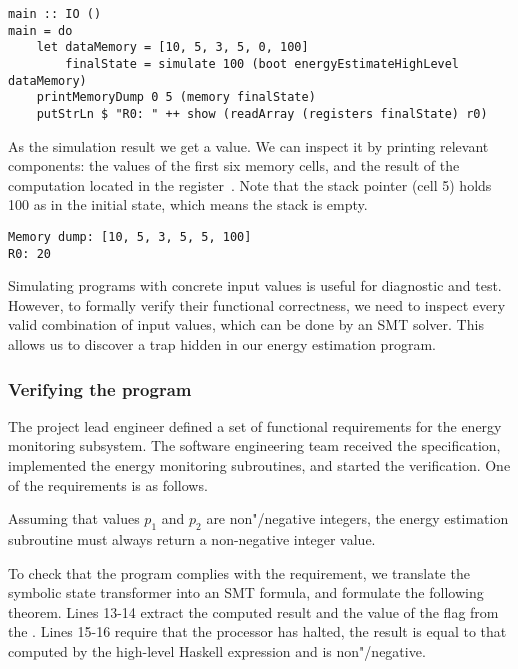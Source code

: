 \begin{verbatim}
main :: IO ()
main = do
    let dataMemory = [10, 5, 3, 5, 0, 100]
        finalState = simulate 100 (boot energyEstimateHighLevel dataMemory)
    printMemoryDump 0 5 (memory finalState)
    putStrLn $ "R0: " ++ show (readArray (registers finalState) r0)
\end{verbatim}


\noindent
As the simulation result we get a  value. We can inspect it by
printing relevant components: the values of the first six memory cells, and the
result of the computation located in the register~. Note that the stack
pointer (cell 5) holds 100 as in the initial state, which means the stack is empty.


\begin{verbatim}
Memory dump: [10, 5, 3, 5, 5, 100]
R0: 20
\end{verbatim}


Simulating programs with concrete input values is useful for diagnostic and test.
However, to formally verify their functional correctness, we need to inspect
every valid combination of input values, which can be done by an SMT solver.
This allows us to discover a trap hidden in our energy estimation program.


\subsubsection{Verifying the program}
The project lead engineer defined a set of functional requirements for the
energy monitoring subsystem. The software engineering team received the
specification, implemented the energy monitoring subroutines, and started the
verification. One of the requirements is as follows.

\begin{tcolorbox}

Assuming that values $p_1$ and $p_2$ are non"/negative integers, the energy
estimation subroutine must always return a non-negative integer value.

\end{tcolorbox}

To check that the program complies with the requirement, we translate the
symbolic state transformer  into an SMT formula,
and formulate the following theorem. Lines 13-14 extract the computed result and
the value of the flag  from the . Lines 15-16 require that
the processor has halted, the result is equal to that computed by the high-level
Haskell expression  and is non"/negative.


